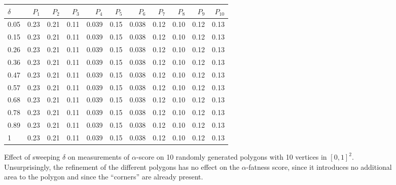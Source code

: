 \documentclass[]{jocg}
\theoremstyle{definition}
\theoremstyle{remark}
\begin{document}
\begin{figure}[t]
  \centering
  \begin{tabular}{lrrrrrrrrrr}
    \toprule
    $\delta$ & $P_1$ & $P_2$ & $P_3$ & $P_4$ & $P_5$ & $P_6$ & $P_7$ & $P_8$ & $P_9$ & $P_{10}$ \\
    \midrule
    0.05 &  0.23 &  0.21 &  0.11 &  0.039 &  0.15 &  0.038 & 0.12 &  0.10 &  0.12 &  0.13 \\
    0.15 &  0.23 &  0.21 &  0.11 &  0.039 &  0.15 &  0.038 & 0.12 &  0.10 &  0.12 &  0.13 \\
    0.26 &  0.23 &  0.21 &  0.11 &  0.039 &  0.15 &  0.038 & 0.12 &  0.10 &  0.12 &  0.13 \\
    0.36 &  0.23 &  0.21 &  0.11 &  0.039 &  0.15 &  0.038 & 0.12 &  0.10 &  0.12 &  0.13 \\
    0.47 &  0.23 &  0.21 &  0.11 &  0.039 &  0.15 &  0.038 & 0.12 &  0.10 &  0.12 &  0.13 \\
    0.57 &  0.23 &  0.21 &  0.11 &  0.039 &  0.15 &  0.038 & 0.12 &  0.10 &  0.12 &  0.13 \\
    0.68 &  0.23 &  0.21 &  0.11 &  0.039 &  0.15 &  0.038 & 0.12 &  0.10 &  0.12 &  0.13 \\
    0.78 &  0.23 &  0.21 &  0.11 &  0.039 &  0.15 &  0.038 & 0.12 &  0.10 &  0.12 &  0.13 \\
    0.89 &  0.23 &  0.21 &  0.11 &  0.039 &  0.15 &  0.038 & 0.12 &  0.10 &  0.12 &  0.13 \\
    1    &  0.23 &  0.21 &  0.11 &  0.039 &  0.15 &  0.038 & 0.12 &  0.10 &  0.12 &  0.13 \\
    \bottomrule
  \end{tabular}
  \caption{%
    Effect of sweeping $\delta$ on measurements of $\alpha$-score on
    10 randomly generated polygons with 10 vertices in $[0,1]^2$.
    Unsurprisingly, the refinement of the different polygons has no effect on
    the $\alpha$-fatness score, since it introduces no additional area to the
    polygon and since the ``corners'' are already present.
  }
  \label{fig:delta-alpha}
\end{figure}
\end{document}
